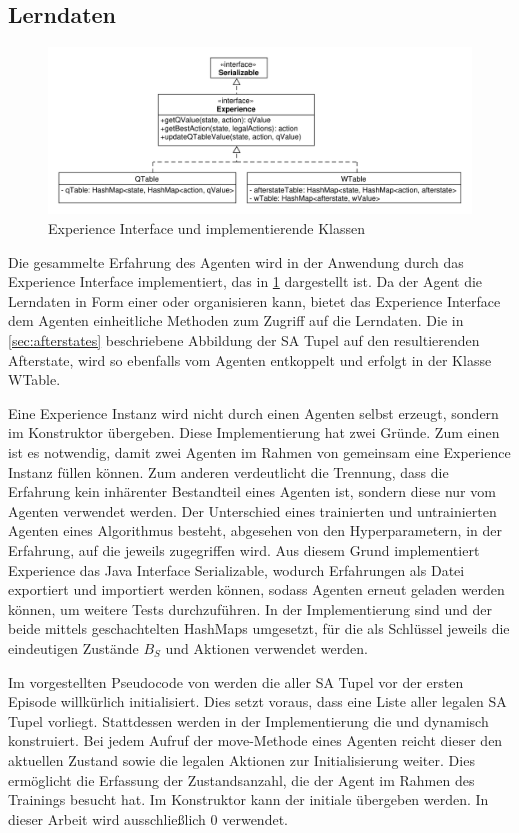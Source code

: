 \subsection{Lerndaten}
\begin{figure}
    \centering
    \includegraphics[width=\textwidth]{04_Artefakte/01_Abbildungen/uml/uml_experience.pdf}
    \caption{Experience Interface und implementierende Klassen}
    \label{fig:uml_experience}
\end{figure}

Die gesammelte Erfahrung des Agenten wird in der Anwendung durch das Experience Interface implementiert, das in \cref{fig:uml_experience} dargestellt ist. 
Da der Agent die Lerndaten in Form einer \qtable oder \wtable organisieren kann, bietet das Experience Interface dem Agenten einheitliche Methoden zum Zugriff auf die Lerndaten. 
Die in \cref{sec:afterstates} beschriebene Abbildung der \ac{SA Tupel} auf den resultierenden Afterstate, wird so ebenfalls vom Agenten entkoppelt und erfolgt in der Klasse WTable.

Eine Experience Instanz wird nicht durch einen Agenten selbst erzeugt, sondern im Konstruktor übergeben. 
Diese Implementierung hat zwei Gründe. 
Zum einen ist es notwendig, damit zwei Agenten im Rahmen von \splay gemeinsam eine Experience Instanz füllen können. 
Zum anderen verdeutlicht die Trennung, dass die Erfahrung kein inhärenter Bestandteil eines Agenten ist, sondern diese nur vom Agenten verwendet werden. 
Der Unterschied eines trainierten und untrainierten Agenten eines Algorithmus besteht, abgesehen von den Hyperparametern, in der Erfahrung, auf die jeweils zugegriffen wird. 
Aus diesem Grund implementiert Experience das Java Interface Serializable, wodurch Erfahrungen als Datei exportiert und importiert werden können, sodass Agenten erneut geladen werden können, um weitere Tests durchzuführen. 
In der Implementierung sind \qtable und der \afterstateTable beide mittels geschachtelten HashMaps umgesetzt, für die als Schlüssel jeweils die eindeutigen Zustände $B_{S}$ und Aktionen verwendet werden.

Im vorgestellten Pseudocode von \bothAlgs werden die \qValues aller \ac{SA Tupel} vor der ersten Episode willkürlich initialisiert. 
Dies setzt voraus, dass eine Liste aller legalen \ac{SA Tupel} vorliegt. 
Stattdessen werden in der Implementierung die \qtable und \wtable dynamisch konstruiert. 
Bei jedem Aufruf der move-Methode eines Agenten reicht dieser den aktuellen Zustand sowie die legalen Aktionen zur Initialisierung weiter. 
Dies ermöglicht die Erfassung der Zustandsanzahl, die der Agent im Rahmen des Trainings besucht hat. 
Im Konstruktor kann der initiale \qValue übergeben werden. 
In dieser Arbeit wird ausschließlich 0 verwendet. 